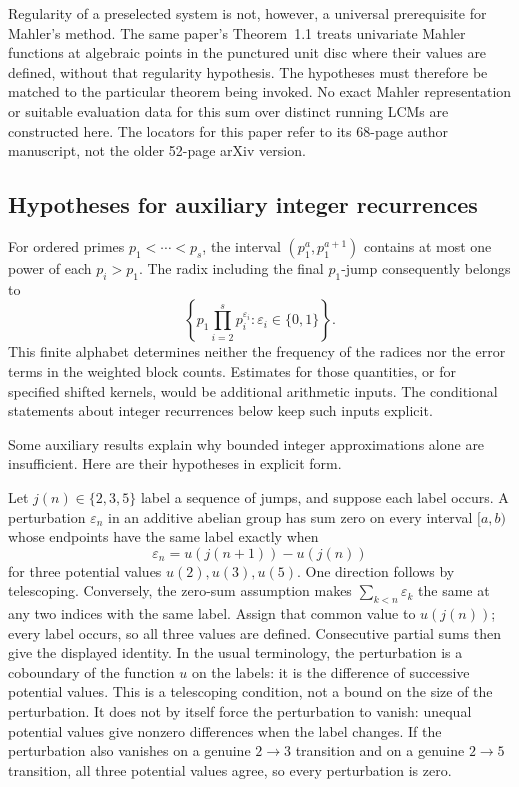 \documentclass[11pt]{article}
\theoremstyle{remark}
\theoremstyle{plain}
\begin{document}
Regularity of a preselected system is not, however, a universal prerequisite
for Mahler's method.  The same paper's Theorem~1.1 treats univariate Mahler
functions at algebraic points in the punctured unit disc where their values
are defined, without that regularity hypothesis.  The hypotheses must
therefore be matched to the particular theorem being invoked.  No exact
Mahler representation or suitable evaluation data for this sum over distinct running LCMs are constructed here.  The locators for this paper refer to its 68-page
author manuscript, not the older 52-page arXiv version.

\subsection{Hypotheses for auxiliary integer recurrences}\label{long269:sec:carry-hypotheses}

For ordered primes $p_1<\cdots<p_s$, the interval
$(p_1^a,p_1^{a+1})$ contains at most one power of each $p_i>p_1$.
The radix including the final $p_1$-jump consequently belongs to
\[
 \left\{p_1\prod_{i=2}^s p_i^{\varepsilon_i}:
                  \varepsilon_i\in\{0,1\}\right\}.
\]
This finite alphabet determines neither the frequency of the radices nor
the error terms in the weighted block counts. Estimates for those
quantities, or for specified shifted kernels, would be additional
arithmetic inputs. The conditional statements about integer recurrences below keep such
inputs explicit.

Some auxiliary results explain why bounded integer approximations alone
are insufficient.  Here are their hypotheses in explicit form.

Let $j(n)\in\{2,3,5\}$ label a sequence of jumps, and suppose each label
occurs.  A perturbation $\varepsilon_n$ in an additive abelian group has
sum zero on every
interval $[a,b)$ whose endpoints have the same label exactly when
\[
 \varepsilon_n=u(j(n+1))-u(j(n))
\]
for three potential values $u(2),u(3),u(5)$.  One direction follows by
telescoping.  Conversely, the zero-sum assumption makes
$\sum_{k<n}\varepsilon_k$ the same at any two indices with the same
label.  Assign that common value to $u(j(n))$; every label occurs, so all
three values are defined.  Consecutive partial sums then give the
displayed identity.  In the usual terminology, the perturbation is a
coboundary of the function $u$ on the labels: it is the difference of
successive potential values.  This is a telescoping condition, not a bound
on the size of the perturbation.  It does not by
itself force the perturbation to vanish: unequal potential values give
nonzero differences when the label changes.  If the perturbation also
vanishes on a genuine $2\to3$ transition and on a genuine $2\to5$
transition, all three potential values agree, so every perturbation is
zero.
\end{document}
